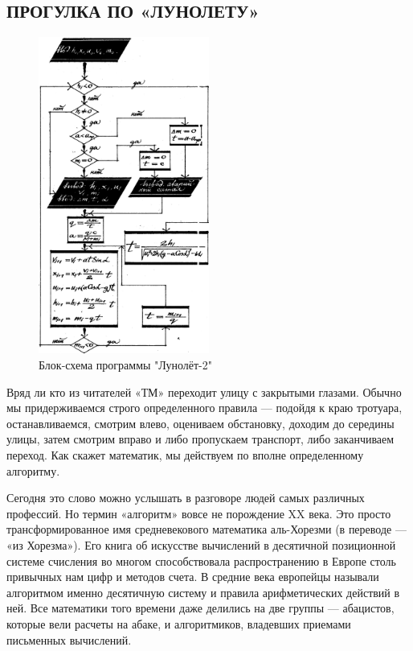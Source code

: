 \documentclass[11pt,a4paper,oneside]{article}
\begin{document}
\subsection{ПРОГУЛКА ПО «ЛУНОЛЕТУ»}
\begin{figure}[H]
\includegraphics[width=0.5\textwidth]{lunolet2_algo}
\caption{Блок-схема программы "Лунолёт-2"}
\end{figure}

Вряд ли кто из читателей «ТМ» переходит улицу с закрытыми глазами. Обычно мы придерживаемся строго определенного правила — подойдя к краю тротуара, останавливаемся, смотрим влево, оцениваем обстановку, доходим до середины улицы, затем смотрим вправо и либо пропускаем транспорт, либо заканчиваем переход. Как скажет математик, мы действуем по вполне определенному алгоритму.

Сегодня это слово можно услышать в разговоре людей самых различных профессий. Но термин «алгоритм» вовсе не порождение XX века. Это просто трансформированное имя средневекового математика аль-Хорезми (в переводе — «из Хорезма»). Его книга об искусстве вычислений в десятичной позиционной системе счисления во многом способствовала распространению в Европе столь привычных нам цифр и методов счета. В средние века европейцы называли алгоритмом именно десятичную систему и правила арифметических действий в ней. Все математики того времени даже делились на две группы — абацистов, которые вели расчеты на абаке, и алгоритмиков, владевших приемами письменных вычислений.
\end{document}
